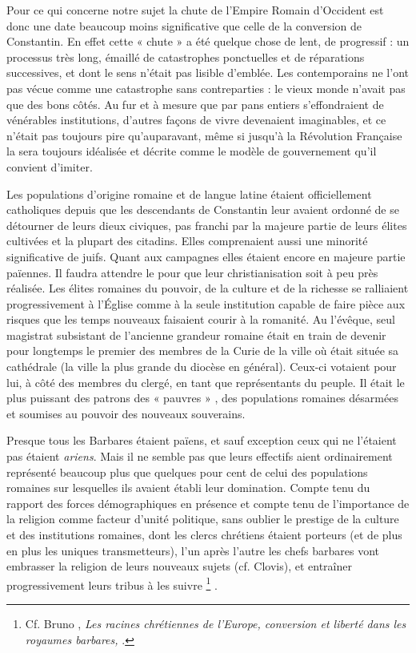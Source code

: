  Pour ce qui concerne notre sujet la chute de l'Empire Romain d'Occident est donc une date beaucoup moins significative que celle de la conversion de Constantin. En effet cette « chute » a été quelque chose de lent, de progressif : un processus très long, émaillé de catastrophes ponctuelles et de réparations successives, et dont le sens n'était pas lisible d'emblée. Les contemporains ne l'ont pas vécue comme une catastrophe sans contreparties : le vieux monde n'avait pas que des bons côtés. Au fur et à mesure que par pans entiers s'effondraient de vénérables institutions, d'autres façons de vivre devenaient imaginables, et ce n'était pas toujours pire qu'auparavant, même si jusqu'à la Révolution Française la  sera toujours idéalisée et décrite comme le modèle de gouvernement qu'il convient d'imiter. 

 Les populations d'origine romaine et de langue latine étaient officiellement catholiques depuis que les descendants de Constantin leur avaient ordonné de se détourner de leurs dieux civiques, pas franchi par la majeure partie de leurs élites cultivées et la plupart des citadins. Elles comprenaient aussi une minorité significative de juifs. Quant aux campagnes elles étaient encore en majeure partie païennes. Il faudra attendre le  pour que leur christianisation soit à peu près réalisée. Les élites romaines du pouvoir, de la culture et de la richesse se ralliaient progressivement à l’Église comme à la seule institution capable de faire pièce aux risques que les temps nouveaux faisaient courir à la romanité. Au  l'évêque, seul magistrat subsistant de l'ancienne grandeur romaine était en train de devenir pour longtemps le premier des membres de la Curie de la ville où était située sa cathédrale (la ville la plus grande du diocèse en général). Ceux-ci votaient pour lui, à côté des membres du clergé, en tant que représentants du peuple. Il était le plus puissant des patrons des « pauvres » , des populations romaines désarmées et soumises au pouvoir des nouveaux souverains. 

 Presque tous les Barbares étaient païens, et sauf exception ceux qui ne l'étaient pas étaient \emph{ariens}. Mais il ne semble pas que leurs effectifs aient ordinairement représenté beaucoup plus que quelques pour cent de celui des populations romaines sur lesquelles ils avaient établi leur domination. Compte tenu du rapport des forces démographiques en présence et compte tenu de l'importance de la religion comme facteur d'unité politique, sans oublier le prestige de la culture et des institutions romaines, dont les clercs chrétiens étaient porteurs (et de plus en plus les uniques transmetteurs), l'un après l'autre les chefs barbares vont embrasser la religion de leurs nouveaux sujets (cf. Clovis), et entraîner progressivement leurs tribus à les suivre%
\footnote{Cf. Bruno , \emph{Les racines chrétiennes de l'Europe, conversion et liberté dans les royaumes barbares, }.}
. 

